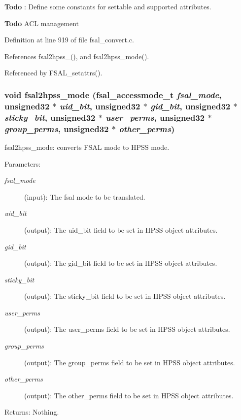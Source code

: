 \begin{Desc}
\item[{\bf Todo}]: Define some constants for settable and supported attributes. \end{Desc}


\begin{Desc}
\item[{\bf Todo}]ACL management \end{Desc}


Definition at line 919 of file fsal\_\-convert.c.

References fsal2hpss\_(), and fsal2hpss\_\-mode().

Referenced by FSAL\_\-setattrs().
\subsubsection[{fsal2hpss\_\-mode}]{\setlength{\rightskip}{0pt plus 5cm}void fsal2hpss\_\-mode (fsal\_\-accessmode\_\-t {\em fsal\_\-mode}, \/  unsigned32 $\ast$ {\em uid\_\-bit}, \/  unsigned32 $\ast$ {\em gid\_\-bit}, \/  unsigned32 $\ast$ {\em sticky\_\-bit}, \/  unsigned32 $\ast$ {\em user\_\-perms}, \/  unsigned32 $\ast$ {\em group\_\-perms}, \/  unsigned32 $\ast$ {\em other\_\-perms})}\label{fsal__convert_8c_11565e39b6627a2e811d25b168eb7658}


fsal2hpss\_\-mode: converts FSAL mode to HPSS mode.

\begin{Desc}
\item[Parameters:]
\begin{description}
\item[{\em fsal\_\-mode}](input): The fsal mode to be translated. \item[{\em uid\_\-bit}](output): The uid\_\-bit field to be set in HPSS object attributes. \item[{\em gid\_\-bit}](output): The gid\_\-bit field to be set in HPSS object attributes. \item[{\em sticky\_\-bit}](output): The sticky\_\-bit field to be set in HPSS object attributes. \item[{\em user\_\-perms}](output): The user\_\-perms field to be set in HPSS object attributes. \item[{\em group\_\-perms}](output): The group\_\-perms field to be set in HPSS object attributes. \item[{\em other\_\-perms}](output): The other\_\-perms field to be set in HPSS object attributes.\end{description}
\end{Desc}
\begin{Desc}
\item[Returns:]Nothing. \end{Desc}


